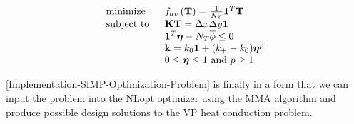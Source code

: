 \begin{equation}
	\begin{tabular}{ll}
		$\text{minimize}$  & $f_{av}\left({\mathbf{T}}\right)=\frac{1}{N_T}\mathbf{1}^T\mathbf{T}$                                                                                     \\
		\text{subject to } & $\mathbf{K}\mathbf{T}=\Delta x\Delta y\mathbf{1}$                                                                   \\
		& $\mathbf{1}^T\boldsymbol{\eta}-N_T\overline{\phi}\leq0$ \\
		& $\mathbf{k}=k_0\mathbf{1}+(k_+-k_0)\boldsymbol{\eta}^p$                                       \\
		& $0\leq\boldsymbol{\eta}\leq 1\text{ and } p\geq 1$
	\end{tabular}\label{Implementation-SIMP-Optimization-Problem}
\end{equation}

\eqref{Implementation-SIMP-Optimization-Problem} is finally in a form that we can input the problem into the NLopt optimizer using the MMA algorithm and produce possible design solutions to the VP heat conduction problem.